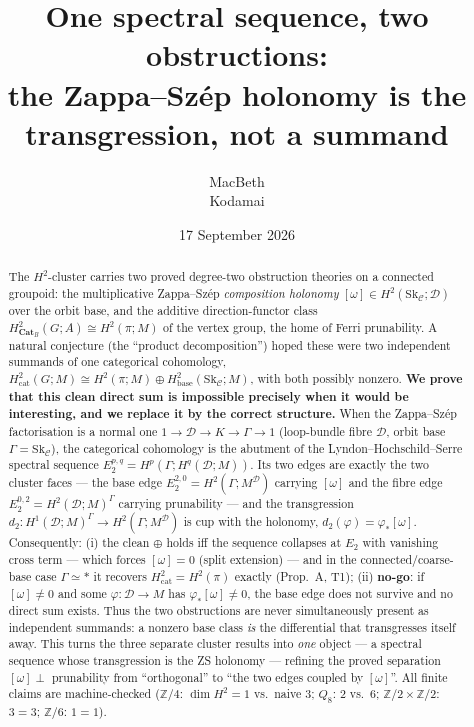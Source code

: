 \documentclass[11pt]{article}
\title{One spectral sequence, two obstructions:\\
the Zappa--Sz\'ep holonomy is the transgression, not a summand}
\author{MacBeth\\\small Kodamai}
\date{17 September 2026}
\theoremstyle{definition}
\newcommand{\Sk}{\mathrm{Sk}}
\newcommand{\C}{\mathcal{C}}
\newcommand{\D}{\mathcal{D}}
\newcommand{\Z}{\mathbb{Z}}
\newcommand{\CatB}{\mathbf{Cat}_B}
\begin{document}
\maketitle

\begin{abstract}
The $H^2$-cluster carries two proved degree-two obstruction theories on a
connected groupoid: the multiplicative Zappa--Sz\'ep \emph{composition holonomy}
$[\omega]\in H^2(\Sk_\C;\D)$ over the orbit base, and the additive
direction-functor class $H^2_{\CatB}(G;A)\cong H^2(\pi;M)$ of the vertex group,
the home of Ferri prunability. A natural conjecture (the ``product
decomposition'') hoped these were two independent summands of one categorical
cohomology, $H^2_{\mathrm{cat}}(G;M)\cong H^2(\pi;M)\oplus H^2_{\mathrm{base}}(\Sk_\C;M)$,
with both possibly nonzero. \textbf{We prove that this clean direct sum is
impossible precisely when it would be interesting, and we replace it by the
correct structure.} When the Zappa--Sz\'ep factorisation is a normal one
$1\to\D\to K\to\Gamma\to1$ (loop-bundle fibre $\D$, orbit base
$\Gamma=\Sk_\C$), the categorical cohomology is the abutment of the
Lyndon--Hochschild--Serre spectral sequence $E_2^{p,q}=H^p(\Gamma;H^q(\D;M))$.
Its two edges are exactly the two cluster faces --- the base edge
$E_2^{2,0}=H^2(\Gamma;M^\D)$ carrying $[\omega]$ and the fibre edge
$E_2^{0,2}=H^2(\D;M)^\Gamma$ carrying prunability --- and the transgression
$d_2\colon H^1(\D;M)^\Gamma\to H^2(\Gamma;M^\D)$ is cup with the holonomy,
$d_2(\varphi)=\varphi_*[\omega]$. Consequently: (i) the clean $\oplus$ holds iff
the sequence collapses at $E_2$ with vanishing cross term --- which forces
$[\omega]=0$ (split extension) --- and in the connected/coarse-base case
$\Gamma\simeq\ast$ it recovers $H^2_{\mathrm{cat}}=H^2(\pi)$ exactly (Prop.~A,
T1); (ii) \textbf{no-go}: if $[\omega]\neq0$ and some $\varphi\colon\D\to M$ has
$\varphi_*[\omega]\neq0$, the base edge does not survive and no direct sum
exists. Thus the two obstructions are never simultaneously present as
independent summands: a nonzero base class \emph{is} the differential that
transgresses itself away. This turns the three separate cluster results into
\emph{one} object --- a spectral sequence whose transgression is the ZS
holonomy --- refining the proved separation $[\omega]\perp$ prunability from
``orthogonal'' to ``the two edges coupled by $[\omega]$''. All finite claims are
machine-checked ($\Z/4$: $\dim H^2=1$ vs.\ naive $3$; $Q_8$: $2$ vs.\ $6$;
$\Z/2\times\Z/2$: $3=3$; $\Z/6$: $1=1$).
\end{abstract}
\end{document}
